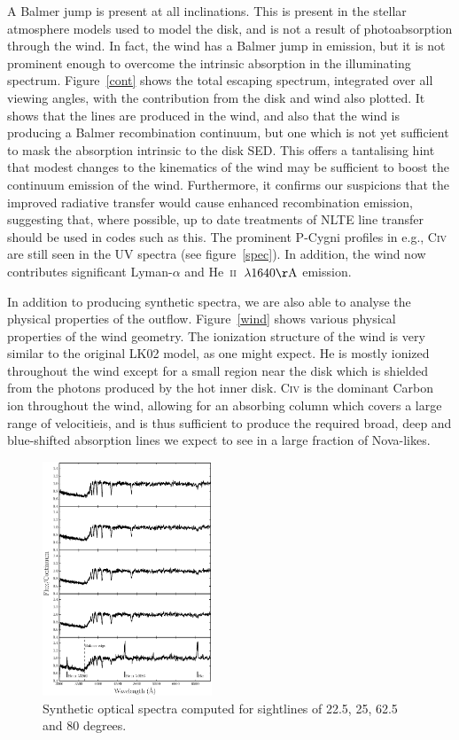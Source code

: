 \documentclass[preprint, a4paper, 11pt]{aastex}
\begin{document}
A Balmer jump is present at all inclinations. This is present
in the stellar atmosphere models used to model the disk,
and is not a result of photoabsorption through the wind.
In fact, the wind has a Balmer jump in emission, but it is not prominent enough
to overcome the intrinsic absorption in the illuminating spectrum. 
Figure~\ref{cont} shows the total escaping spectrum, integrated
over all viewing angles, with the contribution from the disk and wind
also plotted. It shows that the lines are produced in the wind,
and also that the wind is producing a Balmer recombination
continuum, but one which is not yet sufficient to mask the absorption 
intrinsic to the disk SED. This offers a tantalising hint
that modest changes to the kinematics of the wind
may be sufficient to boost the continuum emission of the wind.
Furthermore, it confirms our suspicions that the improved
radiative transfer would cause enhanced recombination emission,
suggesting that, where possible, up to date treatments of
NLTE line transfer should be used in codes such as this.
The prominent P-Cygni profiles in e.g., C\textsc{iv} are still seen
in the UV spectra (see figure~\ref{spec}). In addition, the wind 
now contributes significant Lyman-$\alpha$ and
He~\textsc{ii}~$\lambda1640{\rm \AA}$  emission. 

In addition to producing synthetic spectra, we are also able to 
analyse the physical properties of the outflow.
Figure~\ref{wind} shows various physical properties
of the wind geometry. The ionization structure of the wind
is very similar to the original LK02 model, as one might expect.
He is mostly ionized throughout the wind except for a small region near
the disk which is shielded from the photons produced by the hot inner disk.
C\textsc{iv} is the dominant Carbon ion throughout the wind, allowing
for an absorbing column which covers a large range of velocitieis, and is thus
sufficient to produce the required broad, deep and blue-shifted absorption lines
we expect to see in a large fraction of Nova-likes.

\begin{figure} 
\includegraphics[width=0.45\textwidth]{figures/fig6_opt_cont.eps}
\caption{Synthetic optical spectra computed for 
sightlines of 22.5, 25, 62.5 and 80 degrees.}
\label{spec_continuum}
\end{figure} 
\end{document}
